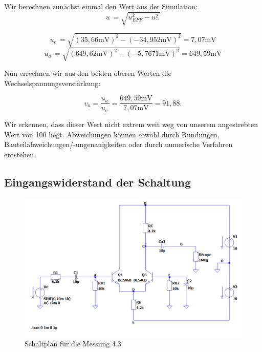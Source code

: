 \documentclass{article}
\begin{document}
Wir berechnen zunächst einmal den Wert aus der Simulation:
\begin{equation}
  \label{eq:7}
  u_{~} = \sqrt{u^{2}_{EFF} - u^{2}_{-}}
\end{equation}

\begin{equation*}
  u_{e~} = \sqrt{(35,66\mathrm{mV})^{2}-(-34,952\mathrm{mV})^{2}} = 7,07\mathrm{mV}
\end{equation*}
\begin{equation*}
  u_{a~} = \sqrt{(649,62\mathrm{mV})^{2}-(-5,7671\mathrm{mV})^{2}} = 649,59\mathrm{mV}
\end{equation*}

Nun errechnen wir aus den beiden oberen Werten die Wechselspannungsverstärkung:

\begin{equation}
  \label{eq:6}
  v_{u} = \frac{u_{a~}}{u_{e~}} = \frac{649,59\mathrm{mV}}{7,07\mathrm{mV}} = 91,88.
\end{equation}

Wir erkennen, dass dieser Wert nicht extrem weit weg von unserem angestrebten Wert von 100 liegt. Abweichungen können sowohl durch Rundungen, Bauteilabweichungen/-ungenauigkeiten oder durch numerische Verfahren entstehen.

\subsection{Eingangswiderstand der Schaltung}

\begin{figure}[h]
  \centering
  \includegraphics[width=\textwidth]{../assets/images/EL2P1/abb5.png}
  \caption{Schaltplan für die Messung 4.3}
  \label{fig:input}
\end{figure}
\end{document}
